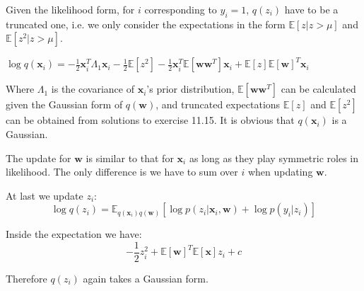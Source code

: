 \documentclass[UTF8]{ctexart}
\begin{document}
Given the likelihood form, for $i$ corresponding to $y_{i}=1$, $q(z_{i})$ have to be a truncated one, i.e. we only consider the expectations in the form $\mathbb{E}[z|z>\mu]$ and $\mathbb{E}[z^{2}|z>\mu]$.

$\log q(\textbf{x}_{i}) = -\frac{1}{2}\textbf{x}_{i}^{T}\Lambda_{1}\textbf{x}_{i}-\frac{1}{2}\mathbb{E}[z^{2}]-\frac{1}{2}\textbf{x}^{T}_{i} \mathbb{E}[\textbf{w}\textbf{w}^{T}]\textbf{x}_{i}+\mathbb{E}[z]\mathbb{E}[\textbf{w}]^{T}\textbf{x}_{i}$

Where $\Lambda_{1}$ is the covariance of $\textbf{x}_{i}$'s prior distribution, $\mathbb{E}[\textbf{w}\textbf{w}^{T}]$ can be calculated given the Gaussian form of $q(\textbf{w})$, and truncated expectations $\mathbb{E}[z]$ and $\mathbb{E}[z^{2}]$ can be obtained from solutions to exercise 11.15. It is obvious that $q(\textbf{x}_{i})$ is a Gaussian.

The update for $\textbf{w}$ is similar to that for $\textbf{x}_{i}$ as long as they play symmetric roles in likelihood. The only difference is we have to sum over $i$ when updating $\textbf{w}$.

At last we update $z_{i}$:
$$\log q(z_{i})=\mathbb{E}_{q(\textbf{x}_{i})q(\textbf{w})}[\log p(z_{i}|\textbf{x}_{i},\textbf{w})+\log p(y_{i}|z_{i})]$$

Inside the expectation we have:
$$-\frac{1}{2}z_{i}^{2}+\mathbb{E}[\textbf{w}]^{T}\mathbb{E}[\textbf{x}]z_{i}+c$$

Therefore $q(z_{i})$ again takes a Gaussian form.
\end{document}
